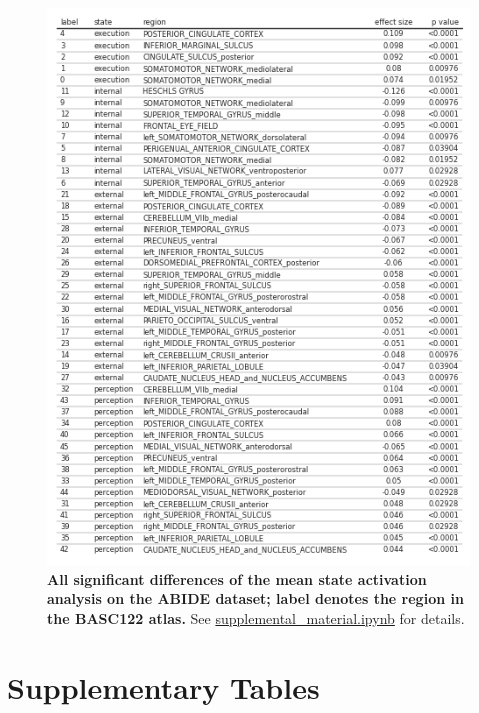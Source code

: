 \documentclass{article}
\begin{document}
\begin{figure}[!htbp]
\centering
\includegraphics[width=0.7\linewidth]{files/clinical_results_tab-8419967323cc4f3b8ed97ff6eb42637e.png}
\caption[]{\textbf{All significant differences of the mean state activation analysis on the ABIDE dataset; label denotes the region
in the BASC122 atlas.} See \href{https://github.com/pni-lab/connattractor/blob/master/notebooks/supplemental\_material.ipynb}{supplemental\_material.ipynb} for details.}
\label{si_clinical_results_table}
\end{figure}

\section{Supplementary Tables}
\end{document}
